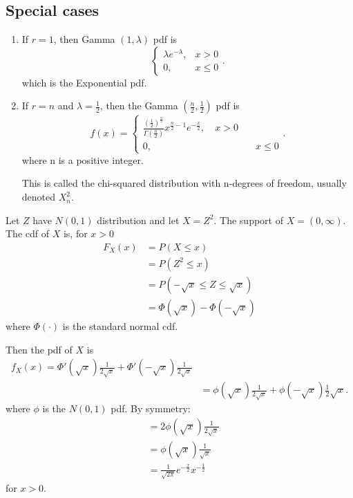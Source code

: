\subsection{Special cases}
\begin{enumerate}
	\item If $r = 1$, then Gamma $\left( 1, \lambda \right) $ pdf is 
		\[
		\begin{cases}
			\lambda e ^{ -\lambda}, & x > 0 \\
			0, & x \le  0
		\end{cases}
		.\] 
		which is the Exponential pdf.
	\item If $r = n$ and $\lambda = \frac{1}{2}$, then the Gamma $\left( \frac{n}{2}, \frac{1}{2} \right) $ pdf is 
		\[
			f\left( x \right) = \begin{cases}
				\frac{\left( \frac{1}{2} \right) ^{\frac{n}{2}}}{\Gamma\left( \frac{n}{2} \right) }x ^{ \frac{n}{2} - 1}e ^{ -\frac{x}{2}}, \quad x > 0 \\
				0, & \quad x \le  0
			\end{cases}
		.\] 
		where n is a positive integer.

		This is called the chi-squared distribution with n-degrees of freedom, usually denoted $X^2_{n}$.
\end{enumerate}

Let $Z$ have $N\left( 0, 1 \right) $ distribution and let $X = Z^2$. The support of $X = \left( 0, \infty \right) $. The cdf of $X$ is, for $x > 0$ 
\begin{align*}
	F_{X}\left( x \right)  &= P\left( X\le  x \right) \\
	&= P\left( Z^2 \le  x \right)  \\
	&= P\left( -\sqrt{x} \le  Z \le  \sqrt{x}  \right)\\
	&= \Phi\left( \sqrt{x}  \right)  - \Phi\left( -\sqrt{x}  \right) 
\end{align*}
where $\Phi\left( \cdot \right) $ is the standard normal cdf. 

Then the pdf of $X$ is 
\begin{align*}
	f _{X}\left( x \right)  = \Phi ' \left( \sqrt{x}  \right) \frac{1}{2 \sqrt{x} } + \Phi ' \left( -\sqrt{x}  \right) \frac{1}{2 \sqrt{x} }\\
	&= \phi \left( \sqrt{x}  \right) \frac{1}{2 \sqrt{x} } + \phi\left( -\sqrt{x}  \right) \frac{1}{2} \sqrt{x} 
.\end{align*}
where $\phi$ is the $N\left( 0, 1 \right) $ pdf. By symmetry:
\begin{align*}
	&= 2 \phi\left( \sqrt{x}  \right) \frac{1}{2\sqrt{x} } \\
	&= \phi\left( \sqrt{x}  \right) \frac{1}{\sqrt{x} } \\
	&= \frac{1}{\sqrt{2 \pi} }e ^{-\frac{x}{2}} x ^{-\frac{1}{2}}
\end{align*}
for $x > 0$. 
